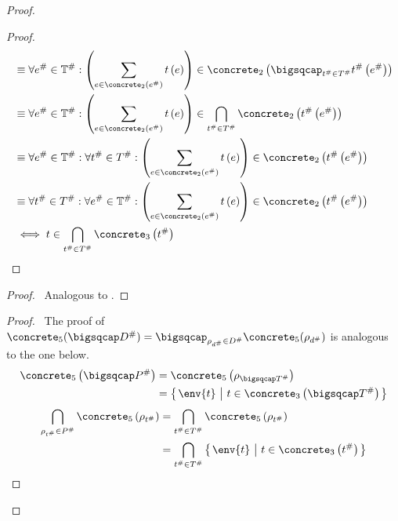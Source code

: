 \begin{proof}
\begin{proof}
\begin{align}
            &\equiv
            \forall e^\# \in \mathbb{T}^\# : \left( \sum_{e \in \concrete_2\left(e^\#\right)} t\left(e\right) \right) \in \concrete_2\left(\bigsqcap_{t^\# \in T^\#} t^\#\left(e^\#\right)\right) \\
            &\equiv
            \forall e^\# \in \mathbb{T}^\# : \left( \sum_{e \in \concrete_2\left(e^\#\right)} t\left(e\right) \right) \in \bigcap_{t^\# \in T^\#} \concrete_2\left(t^\#\left(e^\#\right)\right) \\
            &\equiv
            \forall e^\# \in \mathbb{T}^\# : \forall t^\# \in T^\# : \left( \sum_{e \in \concrete_2\left(e^\#\right)} t\left(e\right) \right) \in \concrete_2\left(t^\#\left(e^\#\right)\right) \\
            &\equiv
            \forall t^\# \in T^\# : \forall e^\# \in \mathbb{T}^\# : \left( \sum_{e \in \concrete_2\left(e^\#\right)} t\left(e\right) \right) \in \concrete_2\left(t^\#\left(e^\#\right)\right) \\
            &\iff
            t \in \bigcap_{t^\# \in T^\#} \concrete_3\left(t^\#\right)
        \end{align}
    \end{proof}
    \begin{proof}
        \pf\ Analogous to .
    \end{proof}
    \begin{proof}
        \pf\ The proof of $\concrete_5(\bigsqcap D^\#) = \bigsqcap_{\rho_{d^\#} \in D^\#} \concrete_5(\rho_{d^\#})$ is analogous to the one below.
        \begin{align}
            \concrete_5 \left( \bigsqcap P^\# \right) &=  \concrete_5 \left( \rho_{\bigsqcap T^\#} \right) \\
            &= \left\{ \left. \env{t} \ \middle| \ t \in \concrete_3 \left( \bigsqcap T^\# \right) \right. \right\}
        \end{align}
        \begin{align}
            \bigcap_{\rho_{t^\#} \in P^\#} \concrete_5 \left( \rho_{t^\#} \right) &= \bigcap_{t^\# \in T^\#} \concrete_5 \left( \rho_{t^\#} \right) \\
            &= \bigcap_{t^\# \in T^\#} \left\{ \left. \env{t} \ \middle| \ t \in \concrete_3 \left( t^\# \right) \right. \right\}

\end{align}
\end{proof}
\end{proof}
